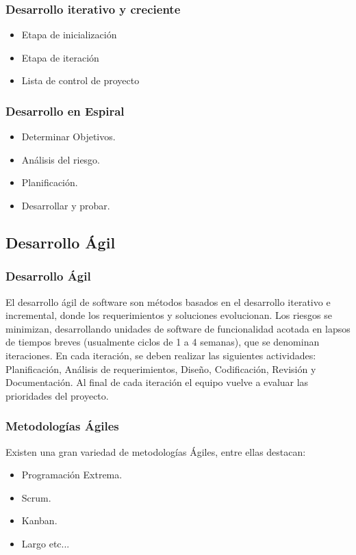 \documentclass[12pt]{beamer}
\begin{document}
\begin{frame}
 \frametitle{Desarrollo iterativo y creciente}
 \begin{itemize}
  \item Etapa de inicialización
  \item Etapa de iteración
  \item Lista de control de proyecto
 \end{itemize}
\end{frame}


\begin{frame}
 \frametitle{Desarrollo en Espiral}
 \begin{itemize}
  \item Determinar Objetivos.
  \item Análisis del riesgo.
  \item Planificación.
  \item Desarrollar y probar. 
 \end{itemize}
\end{frame}

\subsection{Desarrollo Ágil}

\begin{frame}
 \frametitle{Desarrollo Ágil}
 El desarrollo ágil de software son métodos basados en el desarrollo iterativo e incremental, donde los requerimientos y soluciones \alert{evolucionan}.
 \newline
 Los riesgos se minimizan, desarrollando unidades de software de funcionalidad acotada en lapsos de tiempos breves (usualmente ciclos de 1 a 4 semanas), que se denominan \alert{iteraciones}.
 \newline
 En cada iteración, se deben realizar las siguientes actividades: Planificación, Análisis de requerimientos, Diseño, Codificación, Revisión y Documentación. Al final de cada iteración el equipo vuelve a evaluar las prioridades del proyecto.
\end{frame}


\begin{frame}
 \frametitle{Metodologías Ágiles}
 Existen una gran variedad de metodologías Ágiles, entre ellas destacan:
 \begin{itemize}
  \item<2-> Programación Extrema.
  \item<3-> Scrum.
  \item<4-> Kanban.
  \item<5-> Largo etc...
 \end{itemize}
\end{frame}
\end{document}
